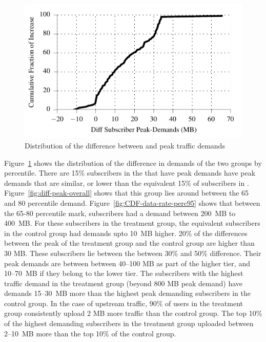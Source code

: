 \begin{figure}[t]
\centering
\includegraphics[width=\linewidth]{figures/cdf_diff_perc95_bytes_subsc-overall.pdf}
               \caption{Distribution of the difference between \treatment{} and \control{}
               peak traffic demands\label{fig:cdf-diff-perc95}}
\end{figure}

Figure~\ref{fig:cdf-diff-perc95} shows the distribution of the
difference in demands of the two groups by percentile. There are 15\%
subscribers in the \treatment{} that have peak demands have peak demands
that are similar, or lower than the equivalent 15\% of subscribers in
\control{}. Figure~\ref{fig:diff-peak-overall} shows that this group
lies around between the 65 and 80 percentile
demand. Figure~\ref{fig:CDF-data-rate-perc95} shows that between the
65-80 percentile mark, subscribers had a demand between 200~MB to
400~MB. For these subscribers in the treatment group, the equivalent
subscribers in the control group had demands upto 10~MB higher. 20\% of the
differences between the peak of the treatment group and the control
group are higher than 30 MB. These subscribers lie between the between
30\% and 50\% difference. Their peak demands are between between 40--100
MB as part of the higher tier, and 10--70~MB if they belong to the lower
tier.  The subscribers with the highest traffic demand in the treatment
group (beyond 800 MB peak demand) have demands 15--30~MB more than the
highest peak demanding subscribers in the control group.  In the case of
upstream traffic, 90\% of users in the treatment group consistently
upload 2 MB more traffic than the control group. The top 10\% of the
highest demanding subscribers in the treatment group uploaded between 2--10~MB
more than the top 10\% of the control group.
\fi

